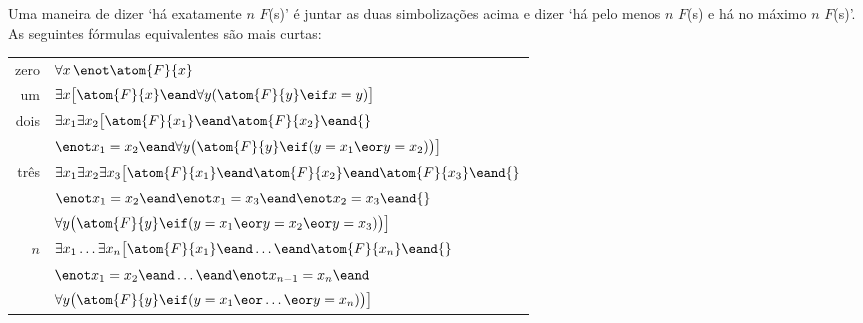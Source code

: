 Uma maneira de dizer `há exatamente $n$ $F$(s)' é juntar as duas simbolizações acima e dizer `há pelo menos $n$ $F$(s) e há no máximo $n$ $F$(s)'. As seguintes fórmulas equivalentes são mais curtas: 
\begin{tabular*}{\textwidth}{rl}
zero & $\forall x\,\enot \atom{F}{x}$\\
um & $\exists x\bigl[\atom{F}{x} \eand \forall y(\atom{F}{y} \eif x = y)\bigr]$\\
dois & $\exists x_1\exists x_2\bigl[\atom{F}{x_1} \eand \atom{F}{x_2} \eand {}$\\
& $\enot x_1 = x_2 \eand \forall y\bigl(\atom{F}{y} \eif (y= x_1 \eor y = x_2)\bigr) \bigr]$\\
três & $\exists x_1\exists x_2\exists x_3\bigl[\atom{F}{x_1} \eand \atom{F}{x_2} \eand \atom{F}{x_3} \eand {}$\\
& $\enot x_1 =  x_2 \eand \enot  x_1 = x_3 \eand \enot x_2 = x_3 \eand {}$\\
& $\forall y\bigl(\atom{F}{y} \eif (y = x_1 \eor y = x_2 \eor y =  x_3)\bigr) \bigr]$\\
$n$ & $\exists x_1\ldots\exists x_n\bigl[\atom{F}{x_1} \eand\ldots\eand \atom{F}{x_n}  \eand {}$\\
&$ \enot x_1 = x_2 \eand\ldots\eand \enot x_{n-1}= x_n \eand \phantom{.}$\\
& $\forall y\bigl(\atom{F}{y} \eif (y= x_1 \eor \ldots \eor y= x_n)\bigr)\bigr]$ 
\end{tabular*}


